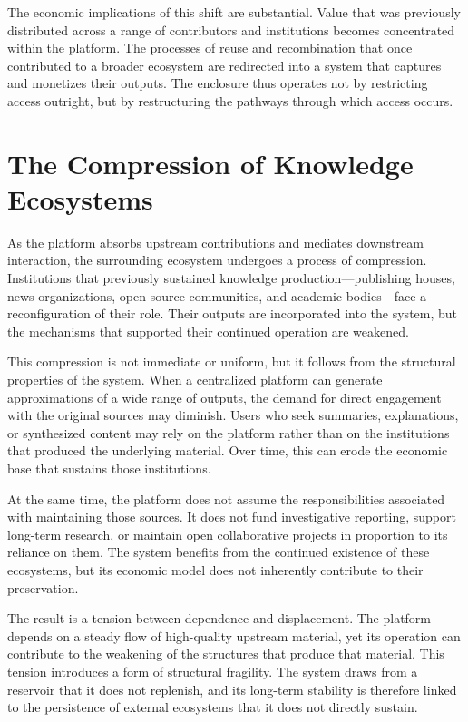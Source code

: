 \documentclass[12pt, oneside]{article}
\begin{document}
The economic implications of this shift are substantial. Value that was previously distributed across a range of contributors and institutions becomes concentrated within the platform. The processes of reuse and recombination that once contributed to a broader ecosystem are redirected into a system that captures and monetizes their outputs. The enclosure thus operates not by restricting access outright, but by restructuring the pathways through which access occurs.

\section{The Compression of Knowledge Ecosystems}

As the platform absorbs upstream contributions and mediates downstream interaction, the surrounding ecosystem undergoes a process of compression. Institutions that previously sustained knowledge production—publishing houses, news organizations, open-source communities, and academic bodies—face a reconfiguration of their role. Their outputs are incorporated into the system, but the mechanisms that supported their continued operation are weakened.

This compression is not immediate or uniform, but it follows from the structural properties of the system. When a centralized platform can generate approximations of a wide range of outputs, the demand for direct engagement with the original sources may diminish. Users who seek summaries, explanations, or synthesized content may rely on the platform rather than on the institutions that produced the underlying material. Over time, this can erode the economic base that sustains those institutions.

At the same time, the platform does not assume the responsibilities associated with maintaining those sources. It does not fund investigative reporting, support long-term research, or maintain open collaborative projects in proportion to its reliance on them. The system benefits from the continued existence of these ecosystems, but its economic model does not inherently contribute to their preservation.

The result is a tension between dependence and displacement. The platform depends on a steady flow of high-quality upstream material, yet its operation can contribute to the weakening of the structures that produce that material. This tension introduces a form of structural fragility. The system draws from a reservoir that it does not replenish, and its long-term stability is therefore linked to the persistence of external ecosystems that it does not directly sustain.
\end{document}
